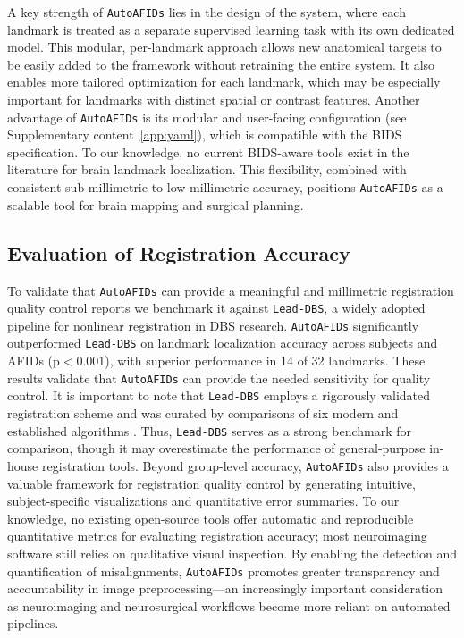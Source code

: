A key strength of \texttt{AutoAFIDs} lies in the design of the system, where each landmark is treated as a separate supervised learning task with its own dedicated model. This modular, per-landmark approach allows new anatomical targets to be easily added to the framework without retraining the entire system. It also enables more tailored optimization for each landmark, which may be especially important for landmarks with distinct spatial or contrast features. Another advantage of \texttt{AutoAFIDs} is its modular and user-facing configuration (see Supplementary content~\ref{app:yaml}), which is compatible with the BIDS specification. To our knowledge, no current BIDS-aware tools exist in the literature for brain landmark localization. This flexibility, combined with consistent sub-millimetric to low-millimetric accuracy, positions \texttt{AutoAFIDs} as a scalable tool for brain mapping and surgical planning.

\subsection{Evaluation of Registration Accuracy}

To validate that \texttt{AutoAFIDs} can provide a meaningful and millimetric registration quality control reports we benchmark it against \texttt{Lead-DBS}, a widely adopted pipeline for nonlinear registration in DBS research. \texttt{AutoAFIDs} significantly outperformed \texttt{Lead-DBS} on landmark localization accuracy across subjects and AFIDs (p\(<\)0.001), with superior performance in 14 of 32 landmarks. These results validate that \texttt{AutoAFIDs} can provide the needed sensitivity for quality control. It is important to note that \texttt{Lead-DBS} employs a rigorously validated registration scheme and was curated by comparisons of six modern and established algorithms \cite{Ewert2019-cc}. Thus, \texttt{Lead-DBS} serves as a strong benchmark for comparison, though it may overestimate the performance of general-purpose in-house registration tools. Beyond group-level accuracy, \texttt{AutoAFIDs} also provides a valuable framework for registration quality control by generating intuitive, subject-specific visualizations and quantitative error summaries. To our knowledge, no existing open-source tools offer automatic and reproducible quantitative metrics for evaluating registration accuracy; most neuroimaging software still relies on qualitative visual inspection. By enabling the detection and quantification of misalignments, \texttt{AutoAFIDs} promotes greater transparency and accountability in image preprocessing—an increasingly important consideration as neuroimaging and neurosurgical workflows become more reliant on automated pipelines.

